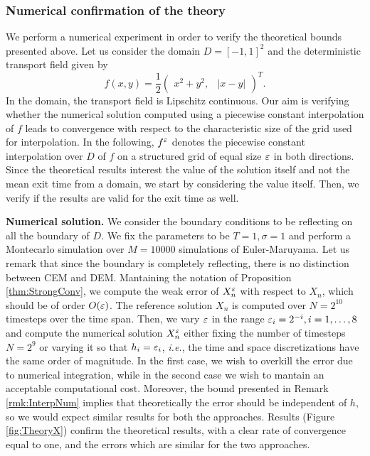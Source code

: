 \subsubsection{Numerical confirmation of the theory}

We perform a numerical experiment in order to verify the theoretical bounds presented above. Let us consider the domain $D = [-1, 1]^2$ and the deterministic transport field given by
\begin{equation*}
	f(x, y) = \frac{1}{2} \begin{pmatrix} x^2 + y^2, & |x - y| \end{pmatrix}^T.
\end{equation*}
In the domain, the transport field is Lipschitz continuous. Our aim is verifying whether the numerical solution computed using a piecewise constant interpolation of $f$ leads to convergence with respect to the characteristic size of the grid used for interpolation. In the following, $f^\varepsilon$ denotes the piecewise constant interpolation over $D$ of $f$ on a structured grid of equal size $\varepsilon$ in both directions. Since the theoretical results interest the value of the solution itself and not the mean exit time from a domain, we start by considering the value itself. Then, we verify if the results are valid for the exit time as well.

\vspace{2mm}
\noindent \textbf{Numerical solution.} We consider the boundary conditions to be reflecting on all the boundary of $D$. We fix the parameters to be $T = 1, \sigma = 1$ and perform a Montecarlo simulation over $M = 10000$ simulations of Euler-Maruyama. Let us remark that since the boundary is completely reflecting, there is no distinction between CEM and DEM. Mantaining the notation of Proposition \ref{thm:StrongConv}, we compute the weak error of $X_n^\varepsilon$ with respect to $X_n$, which should be of order $O(\varepsilon)$. The reference solution $X_n$ is computed over $N = 2^{10}$ timesteps over the time span. Then, we vary $\varepsilon$ in the range $\varepsilon_i = 2^{-i}, i = 1,\dots, 8$ and compute the numerical solution $X_n^\varepsilon$ either fixing the number of timesteps $N = 2^9$ or varying it so that $h_i = \varepsilon_i$, \textit{i.e.}, the time and space discretizations have the same order of magnitude. In the first case, we wish to overkill the error due to numerical integration, while in the second case we wish to mantain an acceptable computational cost. Moreover, the bound presented in Remark \ref{rmk:InterpNum} implies that theoretically the error should be independent of $h$, so we would expect similar results for both the approaches. Results (Figure \ref{fig:TheoryX}) confirm the theoretical results, with a clear rate of convergence equal to one, and the errors which are similar for the two approaches.

